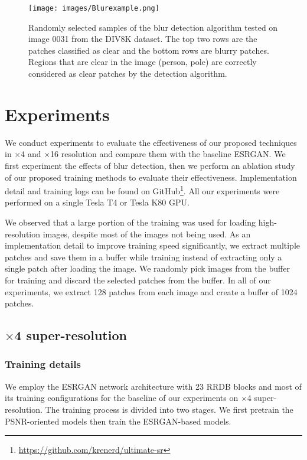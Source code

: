 \documentclass{article}
\begin{document}
\begin{figure}
  \centering
  \texttt{[image: images/Blurexample.png]}
  \caption{Randomly selected samples of the blur detection algorithm tested on image 0031 from the DIV8K dataset. The top two rows are the patches classified as clear and the bottom rows are blurry patches. Regions that are clear in the image (person, pole) are correctly considered as clear patches by the detection algorithm.}
\end{figure}


\section{Experiments}

We conduct experiments to evaluate the effectiveness of our proposed techniques in $\times$4 and $\times$16 resolution and compare them with the baseline ESRGAN. We first experiment the effects of blur detection, then we perform an ablation study of our proposed training methods to evaluate their effectiveness. Implementation detail and training logs can be found on GitHub\footnote{\url{https://github.com/krenerd/ultimate-sr}}. All our experiments were performed on a single Tesla T4 or Tesla K80 GPU. 

We observed that a large portion of the training was used for loading high-resolution images, despite most of the images not being used. As an implementation detail to improve training speed significantly, we extract multiple patches and save them in a buffer while training instead of extracting only a single patch after loading the image. We randomly pick images from the buffer for training and discard the selected patches from the buffer. In all of our experiments, we extract 128 patches from each image and create a buffer of 1024 patches.

\subsection{$\times$4 super-resolution}

\subsubsection{Training details}

We employ the ESRGAN network architecture with 23 RRDB blocks and most of its training configurations for the baseline of our experiments on $\times$4 super-resolution. The training process is divided into two stages. We first pretrain the PSNR-oriented models then train the ESRGAN-based models.
\end{document}
